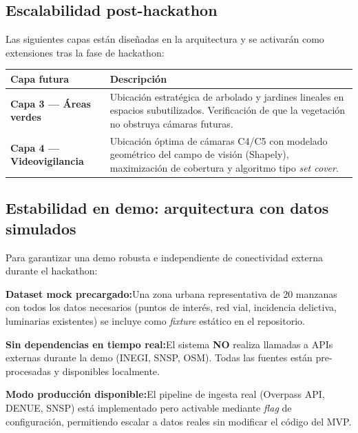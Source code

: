 \documentclass[12pt,a4paper]{article}
\newcommand{\capamvp}[2]{%
  \noindent\textbf{\color{azuloscuro}#1}\quad #2\par\vspace{4pt}%
}
\begin{document}
\subsection{Escalabilidad post-hackathon}

Las siguientes capas están diseñadas en la arquitectura y se activarán como extensiones tras la fase de hackathon:

\begin{table}[H]
\centering
\small
\renewcommand{\arraystretch}{1.3}
\begin{tabularx}{\textwidth}{>{\bfseries}l X}
\toprule
\rowcolor{azuloscuro}
\color{white}\textbf{Capa futura} & \color{white}\textbf{Descripción} \\
\midrule
Capa 3 — Áreas verdes & Ubicación estratégica de arbolado y jardines lineales en espacios subutilizados. Verificación de que la vegetación no obstruya cámaras futuras. \\
\rowcolor{fondogris}
Capa 4 — Videovigilancia & Ubicación óptima de cámaras C4/C5 con modelado geométrico del campo de visión (Shapely), maximización de cobertura y algoritmo tipo \textit{set cover}. \\
\bottomrule
\end{tabularx}
\end{table}

\subsection{Estabilidad en demo: arquitectura con datos simulados}

Para garantizar una demo robusta e independiente de conectividad externa durante el hackathon:

\begin{tcolorbox}[cajaverde, title=Estrategia de Datos para el Hackathon]
\capamvp{Dataset mock precargado:}{Una zona urbana representativa de 20 manzanas con todos los datos necesarios (puntos de interés, red vial, incidencia delictiva, luminarias existentes) se incluye como \textit{fixture} estático en el repositorio.}

\smallskip
\capamvp{Sin dependencias en tiempo real:}{El sistema \textbf{NO} realiza llamadas a APIs externas durante la demo (INEGI, SNSP, OSM). Todas las fuentes están pre-procesadas y disponibles localmente.}

\smallskip
\capamvp{Modo producción disponible:}{El pipeline de ingesta real (Overpass API, DENUE, SNSP) está implementado pero activable mediante \textit{flag} de configuración, permitiendo escalar a datos reales sin modificar el código del MVP.}
\end{tcolorbox}
\end{document}
